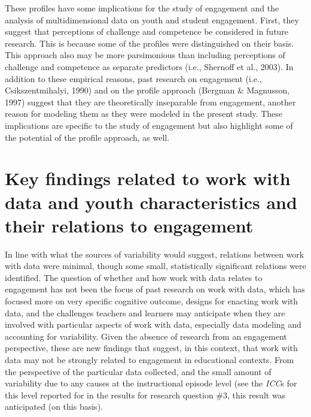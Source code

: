 \documentclass[]{msu-thesis}
\theoremstyle{definition}
\theoremstyle{definition}
\theoremstyle{definition}
\theoremstyle{remark}
\begin{document}
These profiles have some implications for the study of engagement and
the analysis of multidimensional data on youth and student engagement.
First, they suggest that perceptions of challenge and competence be
considered in future research. This is because some of the profiles were
distinguished on their basis. This approach also may be more
parsimonious than including perceptions of challenge and competence as
separate predictors (i.e., Shernoff et al., 2003). In addition to these
empirical reasons, past research on engagement (i.e., Csikszentmihalyi,
1990) and on the profile approach (Bergman \& Magnusson, 1997) suggest
that they are theoretically inseparable from engagement, another reason
for modeling them as they were modeled in the present study. These
implications are specific to the study of engagement but also highlight
some of the potential of the profile approach, as well.

\section{Key findings related to work with data and youth
characteristics and their relations to
engagement}\label{key-findings-related-to-work-with-data-and-youth-characteristics-and-their-relations-to-engagement}

In line with what the sources of variability would suggest, relations
between work with data were minimal, though some small, statistically
significant relations were identified. The question of whether and how
work with data relates to engagement has not been the focus of past
research on work with data, which has focused more on very specific
cognitive outcome, designs for enacting work with data, and the
challenges teachers and learners may anticipate when they are involved
with particular aspects of work with data, especially data modeling and
accounting for variability. Given the absence of research from an
engagement perspective, these are new findings that suggest, in this
context, that work with data may not be strongly related to engagement
in educational contexts. From the perspective of the particular data
collected, and the small amount of variability due to any causes at the
instructional episode level (see the \emph{ICC}s for this level reported
for in the results for research question \#3, this result was
anticipated (on this basis).
\end{document}
